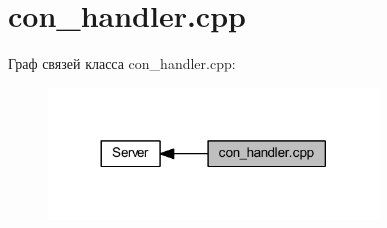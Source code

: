 \hypertarget{group__con__handler__cpp}{}\section{con\+\_\+handler.\+cpp}
\label{group__con__handler__cpp}
Граф связей класса con\+\_\+handler.\+cpp\+:
\nopagebreak
\begin{figure}[H]
\begin{center}
\leavevmode
\includegraphics[width=248pt]{group__con__handler__cpp}
\end{center}
\end{figure}
